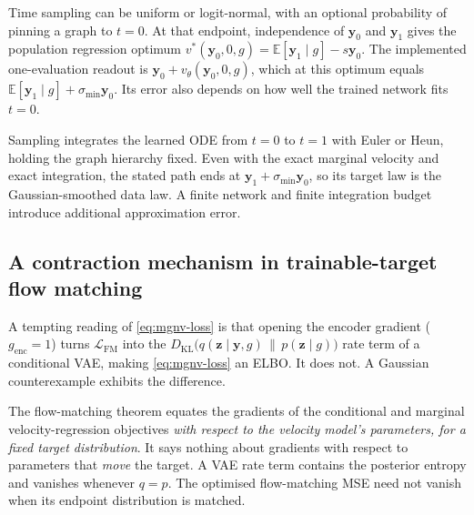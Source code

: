 Time sampling can be uniform or logit-normal, with an optional probability
of pinning a graph to $t=0$. At that endpoint, independence of
$\mathbf{y}_0$ and $\mathbf{y}_1$ gives the population regression optimum
$v^*(\mathbf{y}_0,0,g)=\mathbb{E}[\mathbf{y}_1\mid g]-s\mathbf{y}_0$.
The implemented one-evaluation readout is
$\mathbf{y}_0+v_\theta(\mathbf{y}_0,0,g)$, which at this optimum equals
$\mathbb{E}[\mathbf{y}_1\mid g]+\sigma_{\min}\mathbf{y}_0$. Its error also
depends on how well the trained network fits $t=0$.

Sampling integrates the learned ODE from $t=0$ to $t=1$ with Euler or Heun,
holding the graph hierarchy fixed. Even with the exact marginal velocity
and exact integration, the stated path ends at
$\mathbf{y}_1+\sigma_{\min}\mathbf{y}_0$, so its target law is the
Gaussian-smoothed data law. A finite network and finite integration budget
introduce additional approximation error.

\subsection{A contraction mechanism in trainable-target flow matching}
\label{sec:method:shrink}

A tempting reading of \eqref{eq:mgnv-loss} is that opening the encoder gradient
($g_{\mathrm{enc}}=1$) turns $\mathcal{L}_{\mathrm{FM}}$ into the
$D_{\mathrm{KL}}\bigl(q(\mathbf{z}\mid\mathbf{y},g)\,\|\,p(\mathbf{z}\mid
g)\bigr)$ rate term of a conditional VAE, making \eqref{eq:mgnv-loss} an ELBO.
It does not. A Gaussian counterexample exhibits the difference.

The flow-matching theorem \citep{lipman2023flowmatching} equates the gradients of the conditional and marginal
velocity-regression objectives \emph{with respect to the velocity model's
parameters, for a fixed target distribution}. It says nothing about gradients
with respect to parameters that \emph{move} the target. A VAE rate term
contains the posterior entropy and vanishes whenever $q=p$. The optimised
flow-matching MSE need not vanish when its endpoint distribution is matched.

